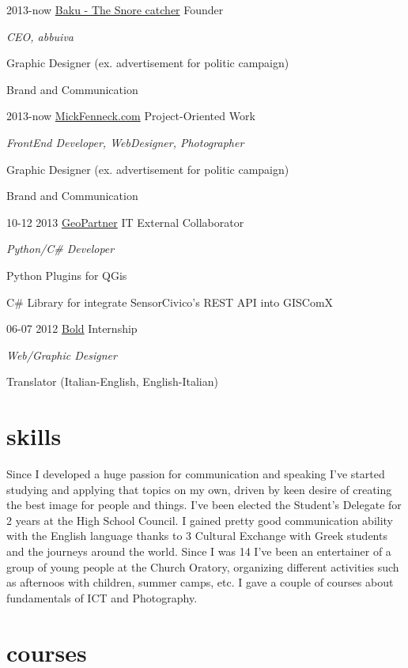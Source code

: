 \documentclass[]{friggeri-cv}
\begin{document}
\begin{entrylist}
\entry
    {2013-now}
    {\href{http://snorecatcher.it/it/benvenuti.html}{Baku - The Snore catcher}}
    {Founder}
    {\emph{CEO, abbuiva}

    {Graphic Designer (ex. advertisement for politic campaign)}

    {Brand and Communication}
    }
\entry
    {2013-now}
    {\href{http://www.mickfenneck.com}{MickFenneck.com}}
    {Project-Oriented Work}
    {\emph{FrontEnd Developer, WebDesigner, Photographer}

	{Graphic Designer (ex. advertisement for politic campaign)}

	{Brand and Communication}

    }
\entry
    {10-12 2013}
    {\href{http://www.geopartner.it}{GeoPartner}}
    {IT External Collaborator}
    {\emph{Python/C\# Developer}

    {Python Plugins for QGis}
    
    {C\# Library for integrate SensorCivico's REST API into GISComX}
    }

\end{entrylist}
\begin{entrylist}
\entry
    {06-07 2012}
    {\href{http://www.studiobold.it}{Bold}}
    {Internship}
    {\emph{Web/Graphic Designer}

    {Translator (Italian-English, English-Italian)}}


\end{entrylist}

\section{skills}

Since I developed a huge passion for communication and speaking I've started studying and applying that topics on my own, driven by keen desire of creating the best image for people and things. I've been elected the Student's Delegate for 2 years at the High School Council. I gained pretty good communication ability with the English language thanks to 3 Cultural Exchange with Greek students and the journeys around the world. Since I was 14 I've been an entertainer of a group of young people at the Church Oratory, organizing different activities such as afternoos with children, summer camps, etc. I gave a couple of courses about fundamentals of ICT and Photography.

\section{courses}
\end{document}
